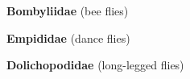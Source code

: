 \documentclass[letterpaper,10pt]{article}
\begin{document}
{\makebox[0.6cm]{}  \textbf{Bombyliidae} (bee flies) \par
\makebox[0.6cm]{}  \textbf{Empididae} (dance flies) \par
\makebox[0.6cm]{}  \textbf{Dolichopodidae} (long-legged flies) \par
}
\end{document}
